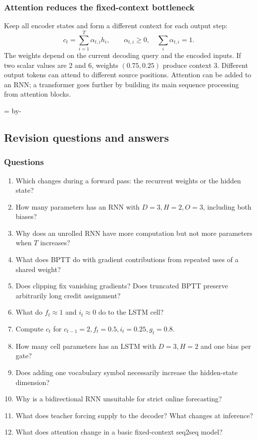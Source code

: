 \documentclass[11pt]{article}
\newcommand{\newsubsection}[1]{\par\begingroup\skip0=\pagegoal\advance\skip0 by-\pagetotal\ifdim\skip0<12\baselineskip\newpage\fi\endgroup\subsection{#1}}
\begin{document}
\subsubsection{Attention reduces the fixed-context bottleneck}
Keep all encoder states and form a different context for each output step:
\[
c_t=\sum_{i=1}^{T}\alpha_{t,i}h_i,\qquad
\alpha_{t,i}\geq0,\quad \sum_i\alpha_{t,i}=1.
\]
The weights depend on the current decoding query and the encoded inputs. If two scalar values are 2 and 6, weights $(0.75,0.25)$ produce context 3. Different output tokens can attend to different source positions. Attention can be added to an RNN; a transformer goes further by building its main sequence processing from attention blocks.

\newsubsection{Revision questions and answers}
\subsubsection{Questions}
\begin{enumerate}
\item Which changes during a forward pass: the recurrent weights or the hidden state?
\item How many parameters has an RNN with $D=3,H=2,O=3$, including both biases?
\item Why does an unrolled RNN have more computation but not more parameters when $T$ increases?
\item What does BPTT do with gradient contributions from repeated uses of a shared weight?
\item Does clipping fix vanishing gradients? Does truncated BPTT preserve arbitrarily long credit assignment?
\item What do $f_t\approx1$ and $i_t\approx0$ do to the LSTM cell?
\item Compute $c_t$ for $c_{t-1}=2,f_t=0.5,i_t=0.25,g_t=0.8$.
\item How many cell parameters has an LSTM with $D=3,H=2$ and one bias per gate?
\item Does adding one vocabulary symbol necessarily increase the hidden-state dimension?
\item Why is a bidirectional RNN unsuitable for strict online forecasting?
\item What does teacher forcing supply to the decoder? What changes at inference?
\item What does attention change in a basic fixed-context seq2seq model?
\end{enumerate}
\end{document}
